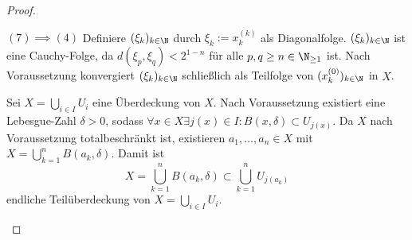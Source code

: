 \begin{st}
\begin{proof}
\begin{seg}{$(7) \implies (4)$}
			Definiere $(\xi_k)_{k\in\N}$ durch $\xi_k := x_k^{(k)}$ als Diagonalfolge.
			$(\xi_k)_{k\in\N}$ ist eine Cauchy-Folge, da $d(\xi_p, \xi_q) < 2^{1-n}$ für alle $p, q \ge n \in \N_{\ge 1}$ ist.
			Nach Voraussetzung konvergiert $(\xi_k)_{k\in\N}$ schließlich als Teilfolge von $(x_k^{(0)})_{k \in \N}$ in $X$.
		\end{seg}
		\begin{seg}[$(6) \implies (1)$]
			Sei $X = \bigcup_{i \in I} U_i$ eine Überdeckung von $X$.
			Nach Voraussetzung existiert eine Lebesgue-Zahl $\delta > 0$, sodass $\forall x \in X \exists j(x) \in I : B(x,\delta) \subset U_{j(x)}$.
			Da $X$ nach Voraussetzung totalbeschränkt ist, existieren $a_1, \dotsc, a_n \in X$ mit $X = \bigcup_{k=1}^n B(a_k, \delta)$.
			Damit ist
			\[
				X = \bigcup_{k=1}^n B(a_k, \delta)
				\subset \bigcup_{k=1}^n U_{j(a_k)}
			\]
			endliche Teilüberdeckung von $X = \bigcup_{i\in I} U_i$.
		\end{seg}
	\end{proof}
\end{st}

